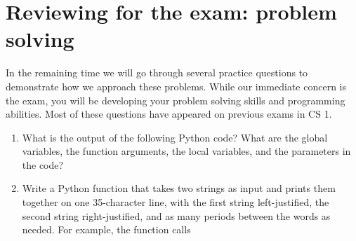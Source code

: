 \documentclass[letterpaper,10pt,english]{sphinxmanual}
\begin{document}
\section{Reviewing for the exam:  problem solving}
\label{\detokenize{lecture_notes/lec07_modules_images:reviewing-for-the-exam-problem-solving}}
In the remaining time we will go through several practice questions to
demonstrate how we approach these problems.  While our immediate
concern is the exam, you will be developing your problem solving
skills and programming abilities.  Most of these questions have
appeared on previous exams in CS 1.
\begin{enumerate}
\item {} 
What is the  output of the following Python code?  What
are the global variables, the function arguments, the local
variables, and the parameters in the code?

%
\begin{sphinxVerbatim}[commandchars=\\\{\}]

  
     
       

\end{sphinxVerbatim}

\item {} 
Write a Python function that takes two strings as input and
prints them together on one 35-character line, with the first string
left-justified, the second string right-justified, and as many
periods between the words as needed.  For example, the function
calls

%
\begin{sphinxVerbatim}[commandchars=\\\{\}]
  
  
\end{sphinxVerbatim}


\end{enumerate}
\end{document}
